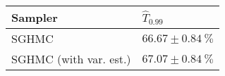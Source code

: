 \begin{tabular}{ll}
\toprule
               Sampler &    $\hat{T}_{0.99}$ \\
\midrule
                 SGHMC & $66.67 \pm 0.84~\%$ \\
SGHMC (with var. est.) & $67.07 \pm 0.84~\%$ \\
\bottomrule
\end{tabular}
